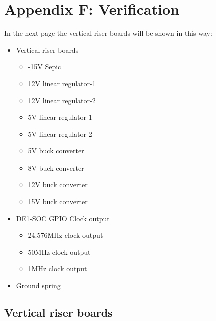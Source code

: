 \chapter*{Appendix F: Verification} \label{chap:Appendix-Verification}
In the next page the vertical riser boards will be shown in this way:

\begin{itemize}
    \item Vertical riser boards
   \begin{itemize}
    \item -15V Sepic
    \item 12V linear regulator-1
    \item 12V linear regulator-2
    \item 5V linear regulator-1
    \item 5V linear regulator-2
    \item 5V buck converter
    \item 8V buck converter
    \item 12V buck converter
    \item 15V buck converter
   \end{itemize}  
	\item DE1-SOC GPIO Clock output
	\begin{itemize}
	\item 24.576MHz clock output
	\item 50MHz clock output
	\item 1MHz clock output
	\end{itemize}
	\item Ground spring
\end{itemize}
\newpage
\section{Vertical riser boards} \label{Appendix-Vertical riser boards}

